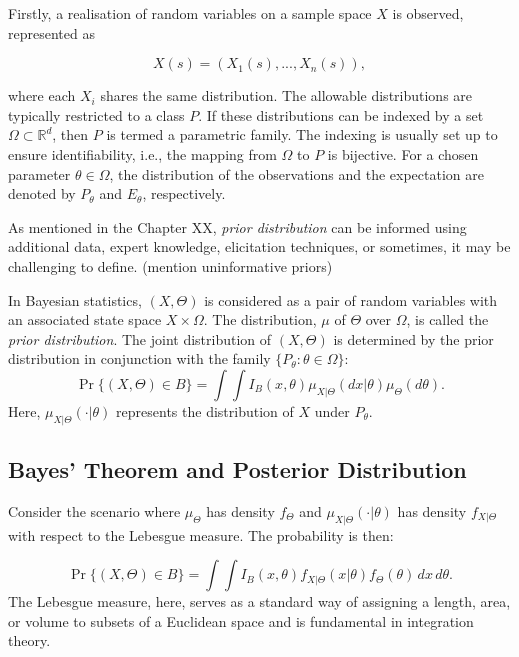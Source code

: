 \documentclass[
  11pt,
]{article}
\begin{document}
Firstly, a realisation of random variables on a sample space \(X\) is
observed, represented as

\begin{equation}
X(s) = (X_1(s), ..., X_n(s)),
\end{equation}

where each \(X_i\) shares the same distribution. The allowable
distributions are typically restricted to a class \(P\). If these
distributions can be indexed by a set \(\Omega \subset \mathbb{R}^d\),
then \(P\) is termed a parametric family. The indexing is usually set up
to ensure identifiability, i.e., the mapping from \(\Omega\) to \(P\) is
bijective. For a chosen parameter \(\theta \in \Omega\), the
distribution of the observations and the expectation are denoted by
\(P_\theta\) and \(E_\theta\), respectively.

As mentioned in the Chapter XX, \emph{prior distribution} can be
informed using additional data, expert knowledge, elicitation
techniques, or sometimes, it may be challenging to define. (mention
uninformative priors)

In Bayesian statistics, \((X, \Theta)\) is considered as a pair of
random variables with an associated state space \(X \times \Omega\). The
distribution, \(\mu\) of \(\Theta\) over \(\Omega\), is called the
\emph{prior distribution}. The joint distribution of \((X, \Theta)\) is
determined by the prior distribution in conjunction with the family
\(\{P_\theta : \theta \in \Omega\}\): \begin{equation}
\Pr\{(X,\Theta) \in B\} = \int \int I_B(x,\theta) \mu_{X|\Theta}(dx|\theta) \mu_{\Theta}(d\theta).
\end{equation} Here, \(\mu_{X|\Theta}(\cdot|\theta)\) represents the
distribution of \(X\) under \(P_{\theta}\).

\subsection{Bayes’ Theorem and Posterior Distribution}

Consider the scenario where \(\mu_{\Theta}\) has density \(f_{\Theta}\)
and \(\mu_{X|\Theta}(\cdot|\theta)\) has density \(f_{X|\Theta}\) with
respect to the Lebesgue measure. The probability is then:

\begin{equation}
\Pr\{(X,\Theta) \in B\} = \int\int I_B(x,\theta)f_{X|\Theta}(x|\theta)f_{\Theta}(\theta) \,dx \,d\theta.
\end{equation} The Lebesgue measure, here, serves as a standard way of
assigning a length, area, or volume to subsets of a Euclidean space and
is fundamental in integration theory.
\end{document}
